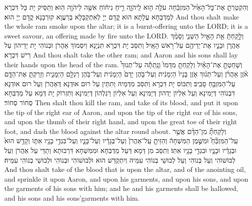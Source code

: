 {%
{וְהִקְטַרְתָּ֤ אֶת־כׇּל־הָאַ֙יִל֙ הַמִּזְבֵּ֔חָה עֹלָ֥ה ה֖וּא לַֽיהֹוָ֑ה רֵ֣יחַ נִיח֔וֹחַ אִשֶּׁ֥ה לַיהֹוָ֖ה הֽוּא׃
}
{וְתַסֵּיק יָת כָּל דִּכְרָא לְמַדְבְּחָא עֲלָתָא הוּא קֳדָם יְיָ לְאִתְקַבָּלָא בְּרַעֲוָא קוּרְבָּנָא קֳדָם יְיָ הוּא׃}
{And thou shalt make the whole ram smoke upon the altar; it is a burnt-offering unto the LORD; it is a sweet savour, an offering made by fire unto the LORD.}{}
{וְלָ֣קַחְתָּ֔ אֵ֖ת הָאַ֣יִל הַשֵּׁנִ֑י וְסָמַ֨ךְ אַהֲרֹ֧ן וּבָנָ֛יו אֶת־יְדֵיהֶ֖ם עַל־רֹ֥אשׁ הָאָֽיִל׃}
{וְתִסַּב יָת דִּכְרָא תִּנְיָנָא וְיִסְמוֹךְ אַהֲרֹן וּבְנוֹהִי יָת יְדֵיהוֹן עַל רֵישׁ דִּכְרָא׃}
{And thou shalt take the other ram; and Aaron and his sons shall lay their hands upon the head of the ram.}{}
{וְשָׁחַטְתָּ֣ אֶת־הָאַ֗יִל וְלָקַחְתָּ֤ מִדָּמוֹ֙ וְנָֽתַתָּ֡ה עַל־תְּנוּךְ֩ אֹ֨זֶן אַהֲרֹ֜ן וְעַל־תְּנ֨וּךְ אֹ֤זֶן בָּנָיו֙ הַיְמָנִ֔ית וְעַל־בֹּ֤הֶן יָדָם֙ הַיְמָנִ֔ית וְעַל־בֹּ֥הֶן רַגְלָ֖ם הַיְמָנִ֑ית וְזָרַקְתָּ֧ אֶת־הַדָּ֛ם עַל־הַמִּזְבֵּ֖חַ סָבִֽיב׃
}
{וְתִכּוֹס יָת דִּכְרָא וְתִסַּב מִדְּמֵיהּ וְתִתֵּין עַל רוּם אוּדְנָא דְּאַהֲרֹן וְעַל רוּם אוּדְנָא דִּבְנוֹהִי דְּיַמִּינָא וְעַל אִלְיוֹן יַדְהוֹן דְּיַמִּינָא וְעַל אִלְיוֹן רַגְלְהוֹן דְּיַמִּינָא וְתִזְרוֹק יָת דְּמָא עַל מַדְבְּחָא סְחוֹר סְחוֹר׃}
{Then shalt thou kill the ram, and take of its blood, and put it upon the tip of the right ear of Aaron, and upon the tip of the right ear of his sons, and upon the thumb of their right hand, and upon the great toe of their right foot, and dash the blood against the altar round about.}{}
{וְלָקַחְתָּ֞ מִן־הַדָּ֨ם אֲשֶׁ֥ר עַֽל־הַמִּזְבֵּ֘חַ֮ וּמִשֶּׁ֣מֶן הַמִּשְׁחָה֒ וְהִזֵּיתָ֤ עַֽל־אַהֲרֹן֙ וְעַל־בְּגָדָ֔יו וְעַל־בָּנָ֛יו וְעַל־בִּגְדֵ֥י בָנָ֖יו אִתּ֑וֹ וְקָדַ֥שׁ הוּא֙ וּבְגָדָ֔יו וּבָנָ֛יו וּבִגְדֵ֥י בָנָ֖יו אִתּֽוֹ׃}
{וְתִסַּב מִן דְּמָא דְּעַל מַדְבְּחָא וּמִמִּשְׁחָא דִּרְבוּתָא וְתַדֵּי עַל אַהֲרֹן וְעַל לְבוּשׁוֹהִי וְעַל בְּנוֹהִי וְעַל לְבוּשֵׁי בְנוֹהִי עִמֵּיהּ וְיִתְקַדַּשׁ הוּא וּלְבוּשׁוֹהִי וּבְנוֹהִי וּלְבוּשֵׁי בְנוֹהִי עִמֵּיהּ׃}
{And thou shalt take of the blood that is upon the altar, and of the anointing oil, and sprinkle it upon Aaron, and upon his garments, and upon his sons, and upon the garments of his sons with him; and he and his garments shall be hallowed, and his sons and his sons’garments with him.}{}
}
